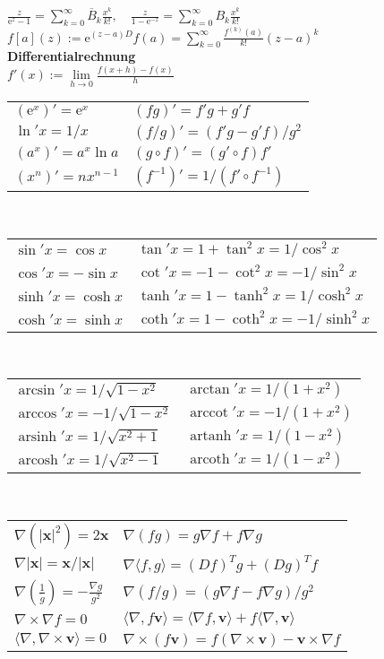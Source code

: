 \documentclass[a4paper,10pt,fleqn,twoside,twocolumn,dvipdfmx]{scrartcl}
\newcommand{\ee}{\mathrm e}
\newcommand{\strong}[1]{\textsf{\textbf{#1}}}
\newcommand{\ds}{\displaystyle}
\newcommand{\bvec}[1]{\mathbf{#1}}
\newcommand{\arccot}{\operatorname{arccot}}
\newcommand{\arsinh}{\operatorname{arsinh}}
\newcommand{\arcosh}{\operatorname{arcosh}}
\newcommand{\artanh}{\operatorname{artanh}}
\newcommand{\arcoth}{\operatorname{arcoth}}
\begin{document}
$\ds\frac{z}{\ee^z-1} = {\textstyle\sum\limits_{k=0}^\infty} \overline B_k \frac{x^k}{k!},\quad
\ds\frac{z}{1-\ee^{-z}} = {\textstyle\sum\limits_{k=0}^\infty} B_k\frac{x^k}{k!}$\\
$\ds f[a](z) := \ee^{(z-a)D}f(a) = {\textstyle\sum\limits_{k=0}^\infty} \frac{f^{(k)}(a)}{k!}(z-a)^k$\\[4pt]
\strong{Differentialrechnung}\\[2pt]
$f'(x) := \lim\limits_{h\to 0}\frac{f(x+h)-f(x)}{h}$\\
\begin{tabular}{@{}l|l}
$(\ee^x)' = \ee^x$ & $(fg)'=f'g+g'f$\\
$\ln' x = 1/x$ & $(f/g)'=(f'g-g'f)/g^2$\\
$(a^x)' = a^x\ln a$ & $(g\circ f)' = (g'\circ f)f'$\\
$(x^n)' = nx^{n-1}$ & $(f^{-1})' = 1/(f'\circ f^{-1})$
\end{tabular}\\
\begin{tabular}{@{}l|l}
$\sin'x = \cos x$ & $\tan'x = 1+\tan^2 x = 1/\cos^2 x$\\
$\cos'x = -\sin x$ & $\cot'x = -1-\cot^2 x = -1/\sin^2 x$\\
$\sinh'x = \cosh x$ & $\tanh'x = 1-\tanh^2 x = 1/\cosh^2 x$\\
$\cosh'x = \sinh x$ & $\coth'x = 1-\coth^2 x = -1/\sinh^2 x$
\end{tabular}\\
\begin{tabular}{@{}l|l}
$\arcsin'x = 1/\sqrt{1-x^2}$ & $\arctan'x = 1/(1+x^2)$\\
$\arccos'x = -1/\sqrt{1-x^2}$ & $\arccot'x = -1/(1+x^2)$\\ 
$\arsinh'x = 1/\sqrt{x^2+1}$ & $\artanh'x = 1/(1-x^2)$\\
$\arcosh'x = 1/\sqrt{x^2-1}$ & $\arcoth'x = 1/(1-x^2)$
\end{tabular}\\
\begin{tabular}{@{}l|l}
$\nabla(|\mathbf x|^2) = 2\mathbf x$ & $\nabla (fg) = g\nabla f+f\nabla g$\\
$\nabla |\mathbf x| = \mathbf x/|\mathbf x|$ & $\nabla\langle f,g\rangle = (Df)^T g+(Dg)^T f$\\
$\nabla (\tfrac{1}{g}) = -\frac{\nabla g}{g^2}$
& $\nabla(f/g) = (g\nabla f-f\nabla g)/g^2$\\
$\nabla\times\nabla f = 0$
& $\langle\nabla,f\bvec v\rangle
= \langle\nabla f,\bvec v\rangle + f\langle\nabla,\bvec v\rangle$\\
$\langle\nabla,\nabla\times\bvec v\rangle = 0$
& $\nabla\times(f\bvec v)
= f(\nabla\times\bvec v) - \bvec v\times \nabla f$
\end{tabular}\\[4pt]
\end{document}
